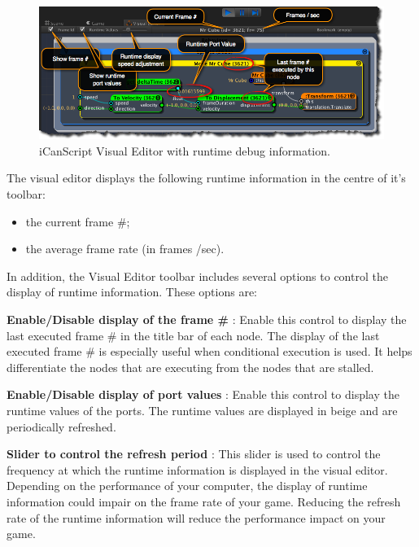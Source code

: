 \begin{figure}[htbp]
\centering
\includegraphics[keepaspectratio,width=\textwidth,height=0.75\textheight]{runtime-display.png}
\caption{iCanScript Visual Editor with runtime debug information.}
\label{runtime-display.png}
\end{figure}

The visual editor displays the following runtime information in the centre of it's toolbar:

\begin{itemize}
\item the current frame \#;

\item the average frame rate (in frames \slash  sec).

\end{itemize}

In addition, the Visual Editor toolbar includes several options to control the display of runtime information. These options are:

\textbf{Enable\slash Disable display of the frame \#}
 : Enable this control to display the last executed frame \# in the title bar of each node. The display of the last executed frame \# is especially useful when conditional execution is used. It helps differentiate the nodes that are executing from the nodes that are stalled.

\textbf{Enable\slash Disable display of port values}
 : Enable this control to display the runtime values of the ports. The runtime values are displayed in beige and are periodically refreshed.

\textbf{Slider to control the refresh period}
 : This slider is used to control the frequency at which the runtime information is displayed in the visual editor. Depending on the performance of your computer, the display of runtime information could impair on the frame rate of your game. Reducing the refresh rate of the runtime information will reduce the performance impact on your game.

